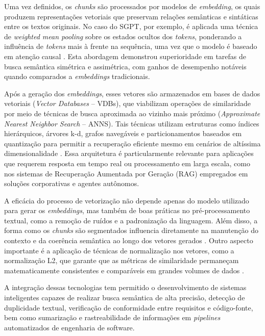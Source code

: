 Uma vez definidos, os \textit{chunks} são processados por modelos de \textit{embedding}, os quais produzem representações vetoriais que preservam relações semânticas e sintáticas entre os textos originais. No caso do SGPT, por exemplo, é aplicada uma técnica de \textit{weighted mean pooling} sobre os estados ocultos dos \textit{tokens}, ponderando a influência de \textit{tokens} mais à frente na sequência, uma vez que o modelo é baseado em atenção causal . Esta abordagem demonstrou superioridade em tarefas de busca semântica simétrica e assimétrica, com ganhos de desempenho notáveis quando comparados a \textit{embeddings} tradicionais.

Após a geração dos \textit{embeddings}, esses vetores são armazenados em bases de dados vetoriais (\textit{Vector Databases} – VDBs), que viabilizam operações de similaridade por meio de técnicas de busca aproximada ao vizinho mais próximo (\textit{Approximate Nearest Neighbor Search} – ANNS). Tais técnicas utilizam estruturas como índices hierárquicos, árvores k-d, grafos navegáveis e particionamentos baseados em quantização para permitir a recuperação eficiente mesmo em cenários de altíssima dimensionalidade . Essa arquitetura é particularmente relevante para aplicações que requerem resposta em tempo real ou processamento em larga escala, como nos sistemas de Recuperação Aumentada por Geração (RAG) empregados em soluções corporativas e agentes autônomos.

A eficácia do processo de vetorização não depende apenas do modelo utilizado para gerar os \textit{embeddings}, mas também de boas práticas no pré-processamento textual, como a remoção de ruídos e a padronização da linguagem. Além disso, a forma como os \textit{chunks} são segmentados influencia diretamente na manutenção do contexto e da coerência semântica ao longo dos vetores gerados . Outro aspecto importante é a aplicação de técnicas de normalização nos vetores, como a normalização L2, que garante que as métricas de similaridade permaneçam matematicamente consistentes e comparáveis em grandes volumes de dados .

A integração dessas tecnologias tem permitido o desenvolvimento de sistemas inteligentes capazes de realizar busca semântica de alta precisão, detecção de duplicidade textual, verificação de conformidade entre requisitos e código-fonte, bem como sumarização e rastreabilidade de informações em \textit{pipelines} automatizados de engenharia de software.


